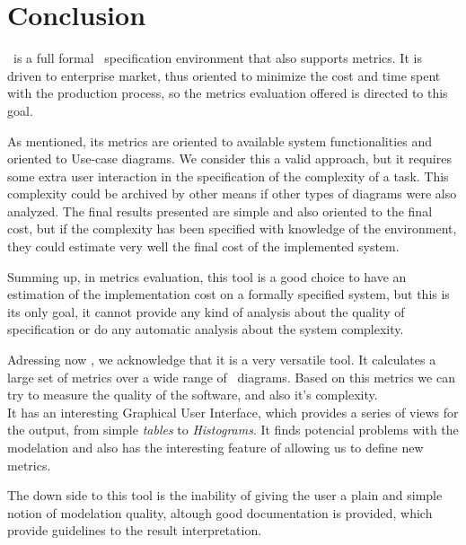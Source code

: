 \section{Conclusion} \label{conc}
\entArch\ is a full formal \uml\ specification environment that also supports metrics. 
It is driven to enterprise market, thus oriented to minimize the cost and time spent with the production process, so the metrics evaluation offered is directed to this goal.

As mentioned, its metrics are oriented to available system functionalities and oriented to Use-case diagrams. 
We consider this a valid approach, but it requires some extra user interaction in the specification of the complexity of a task.
This complexity could be archived by other means if other types of diagrams were also analyzed.
The final results presented are simple and also oriented to the final cost, but if the complexity has been specified with knowledge of the environment, they could estimate very well the final cost of the implemented system.

Summing up, in metrics evaluation, this tool is a good choice to have an estimation of the implementation cost on a formally specified system, but this is its only goal, it cannot provide any kind of analysis about the quality of specification or do any automatic analysis about the system complexity.

Adressing now \sdmetrics, we acknowledge that it is a very versatile tool. It calculates a large set of metrics over a wide range of \uml\ diagrams. Based on this metrics we can try to measure the quality of the software, and also it's complexity.\\
It has an interesting Graphical User Interface, which provides a series of views for the output, from simple \emph{tables} to \emph{Histograms}. It finds potencial problems with the modelation and also has the interesting feature of allowing us to define new metrics.

The down side to this tool is the inability of giving the user a plain and simple notion of modelation quality, altough good documentation is provided,  which provide guidelines to the result interpretation.
 

